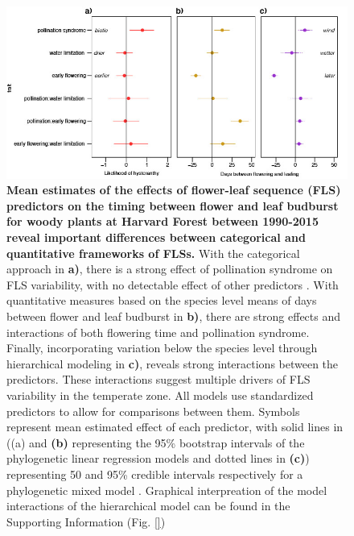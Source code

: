 \documentclass[11pt]{article}
\begin{document}
\pagebreak  

 \begin{figure}[h!]
        \centering
         \includegraphics[width=\textwidth]{..//..//HFmodelplots.jpg}
          \caption{\textbf{Mean estimates of the effects of flower-leaf sequence (FLS) predictors on the timing between flower and leaf budburst for woody plants at Harvard Forest between 1990-2015 reveal important differences between categorical and quantitative frameworks of FLSs.}  With the categorical approach in \textbf{a)}, there is a strong effect of  pollination syndrome on FLS variability, with no detectable effect of other predictors . With quantitative measures based on the species level means of days between flower and leaf budburst in \textbf{b)}, there are strong effects and interactions of both flowering time and pollination syndrome. Finally, incorporating variation below the species level through hierarchical modeling in \textbf{c)}, reveals strong interactions between the predictors. These interactions suggest multiple drivers of FLS variability in the temperate zone.  All models use standardized predictors to allow for comparisons between them. Symbols represent mean estimated effect of each predictor, with solid lines in \textbg({(a)} and \textbf{(b)} representing the 95\% bootstrap intervals of the phylogenetic linear regression models\citep{Ives2010} and dotted lines in \textbf{(c)}) representing 50 and 95\% credible intervals respectively for a phylogenetic mixed model \citep{Garamszegi2014}. Graphical interpreation of the model interactions of the hierarchical model can be found in the Supporting Information (Fig. \ref{})}  
        \label{fig:muplots.HF}
    \end{figure}    

    
\end{document}
